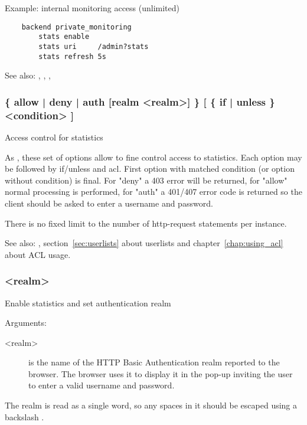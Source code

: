 {   Example: internal monitoring access (unlimited)
   \begin{verbatim}
    backend private_monitoring
        stats enable
        stats uri     /admin?stats
        stats refresh 5s
   \end{verbatim}

  See also: , , , 

\subsubsection[stats http-request]{ \{ allow | deny | auth [realm <realm>] \} [ \{ if | unless \} <condition> ]}

  Access control for statistics


  As , these set of options allow to fine control access to
  statistics. Each option may be followed by if/unless and acl.
  First option with matched condition (or option without condition) is final.
  For "deny" a 403 error will be returned, for "allow" normal processing is
  performed, for "auth" a 401/407 error code is returned so the client
  should be asked to enter a username and password.

  There is no fixed limit to the number of http-request statements per
  instance.

  See also: , section~\ref{sec:userlists} about userlists and chapter~\ref{chap:using_acl}
             about ACL usage.

\subsubsection[stats realm]{ <realm>}

  Enable statistics and set authentication realm


  Arguments:
  \begin{description}
  \item[<realm>] is the name of the HTTP Basic Authentication realm reported to
              the browser. The browser uses it to display it in the pop-up
              inviting the user to enter a valid username and password.
  \end{description}

  The realm is read as a single word, so any spaces in it should be escaped
  using a backslash \chr{\bslash}.

}
